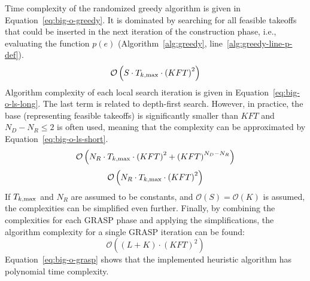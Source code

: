 Time complexity of the randomized greedy algorithm is given in Equation~\ref{eq:big-o-greedy}.
It is dominated by searching for all feasible takeoffs that could be inserted in the next iteration of the construction phase, i.e., evaluating the function $p(e)$ (Algorithm~\ref{alg:greedy}, line~\ref{alg:greedy-line-p-def}).
\begin{equation}\label{eq:big-o-greedy}
\mathcal{O} \left(
S \cdot T_{k, \mathrm{max}} \cdot \left( K F T \right) ^ 2
\right)
\end{equation}
Algorithm complexity of each local search iteration is given in Equation~\ref{eq:big-o-ls-long}.
The last term is related to depth-first search.
However, in practice, the base (representing feasible takeoffs) is significantly smaller than $K F T$ and $N_D - N_R \le 2$ is often used, meaning that the complexity can be approximated by Equation~\ref{eq:big-o-ls-short}.
\begin{equation}\label{eq:big-o-ls-long}
\mathcal{O} \left(
N_R \cdot T_{k, \mathrm{max}} \cdot \left( K F T \right) ^ 2 + \left( K F T \right) ^ {N_D - N_R}
\right)
\end{equation}
\begin{equation}\label{eq:big-o-ls-short}
\mathcal{O} \left(
N_R \cdot T_{k, \mathrm{max}} \cdot \left( K F T \right) ^ 2
\right)
\end{equation}
If $T_{k, \mathrm{max}}$ and $N_R$ are assumed to be constants, and $\mathcal{O}(S) = \mathcal{O}(K)$ is assumed, the complexities can be simplified even further.
Finally, by combining the complexities for each GRASP phase and applying the simplifications, the algorithm complexity for a single GRASP iteration can be found:
\begin{equation}\label{eq:big-o-grasp}
\mathcal{O} \left(
\left( L + K \right) \cdot \left( K F T \right) ^ 2
\right)
\end{equation}
Equation~\ref{eq:big-o-grasp} shows that the implemented heuristic algorithm has polynomial time complexity.
